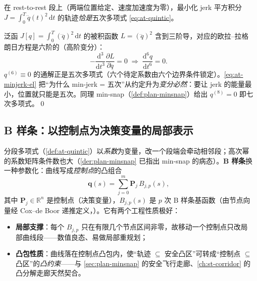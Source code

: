 \begin{theorem}\label{thm:at-minjerk-quintic}
在 rest-to-rest 段上（两端位置给定、速度加速度为零），最小化 jerk 平方积分 $J=\int_0^{T}\dddot q(t)^2\,\mathrm{d}t$ 的轨迹\emph{恰是}五次多项式 \cref{eq:at-quintic}。
\end{theorem}

\begin{derivation}\label{der:at-minjerk}
泛函 $J[q]=\int_0^T(\dddot q)^2\,\mathrm{d}t$ 的被积函数 $L=(\dddot q)^2$ 含到三阶导，对应的欧拉--拉格朗日方程是六阶的（高阶变分）：
\begin{equation}
  -\frac{\mathrm{d}^3}{\mathrm{d}t^3}\frac{\partial L}{\partial \dddot q}=0
  \;\Longrightarrow\;
  \frac{\mathrm{d}^6 q}{\mathrm{d}t^6}=0.
  \label{eq:at-minjerk-el}
\end{equation}
$q^{(6)}\equiv 0$ 的通解正是五次多项式（六个待定系数由六个边界条件锁定）。\cref{eq:at-minjerk-el} 把“为什么 min-jerk = 五次”从约定升为\emph{变分必然}：要让 jerk 的能量最小，位置就只能是五次。同理 min-snap（\cref{def:plan-minsnap}）给出 $q^{(8)}=0$ 即七次多项式。\qed
\end{derivation}

\subsection{B 样条：以控制点为决策变量的局部表示}
\label{subsec:at-bspline}

分段多项式（\cref{def:at-quintic}）以\emph{系数}为变量，改一个段端会牵动相邻段；高次幂的系数矩阵条件数也大（\cref{der:plan-minsnap} 已指出 min-snap 的病态）。\textbf{B 样条}换一种参数化：曲线写成\emph{控制点}的凸组合
\begin{equation}
  \mathbf{q}(s)=\sum_{j=0}^{m} \mathbf{P}_j\, B_{j,p}(s),
  \label{eq:at-bspline}
\end{equation}
其中 $\mathbf{P}_j\in\mathbb{R}^n$ 是控制点（决策变量），$B_{j,p}(s)$ 是 $p$ 次 B 样条基函数（由节点向量经 Cox--de Boor 递推定义，\cite{biagiotti2008trajectory}）。它有两个工程性质极好：
\begin{itemize}
  \item \textbf{局部支撑}：每个 $B_{j,p}$ 只在有限几个节点区间非零，故移动一个控制点只改局部曲线段——数值良态、易做局部重规划；
  \item \textbf{凸包性质}：曲线落在控制点凸包内，使“轨迹 $\subseteq$ 安全凸区”可转成“控制点 $\subseteq$ 凸区”的\emph{凸约束}——与 \cref{sec:plan-minsnap} 的安全飞行走廊、\cref{ch:st-corridor} 的凸分解走廊天然契合。
\end{itemize}

